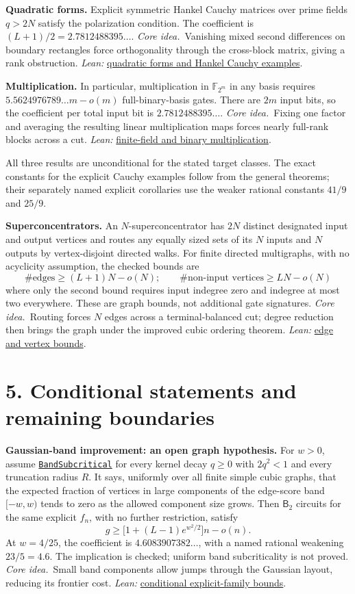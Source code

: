 \documentclass[11pt]{article}
\providecommand{\RepoRoot}{../../}
\newcommand{\repolink}[2]{\href{\RepoRoot#1}{#2}}
\newcommand{\leanlink}[2]{\repolink{Complexitylib/Algebraic/LowerBound/Cutwidth/#1}{#2}}
\newcommand{\method}{\textit{Core idea.}\ }
\newcommand{\Btwo}{\mathsf{B}_2}
\newcommand{\little}[1]{o(#1)}
\begin{document}
\textbf{Quadratic forms.} Explicit symmetric Hankel Cauchy matrices over prime
fields $q>2N$ satisfy the polarization condition. The coefficient is
$(L+1)/2=2.7812488395\ldots$.
\method Vanishing mixed second differences on boundary rectangles force
orthogonality through the cross-block matrix, giving a rank obstruction.
\textit{Lean:} \leanlink{MultiOutput/Quadratic.lean}{quadratic forms and Hankel Cauchy examples}.

\textbf{Multiplication.} In particular, multiplication in $\mathbb F_{2^m}$ in
any basis requires $5.5624976789\ldots m-\little m$ full-binary-basis gates.
There are $2m$ input bits, so the coefficient per total input bit is
$2.7812488395\ldots$.
\method Fixing one factor and averaging the resulting linear multiplication
maps forces nearly full-rank blocks across a cut.
\textit{Lean:} \leanlink{MultiOutput/FieldMul.lean}{finite-field and binary multiplication}.

All three results are unconditional for the stated target classes.
The exact constants for the explicit Cauchy examples follow from the general
theorems; their separately named explicit corollaries use the weaker rational
constants $41/9$ and $25/9$.

\medskip
\textbf{Superconcentrators.} An $N$-superconcentrator has $2N$ distinct designated
input and output vertices and routes any equally sized sets of its $N$ inputs
and $N$ outputs by vertex-disjoint directed walks.
For finite directed multigraphs, with no acyclicity assumption, the checked bounds are
\[
 \#\text{edges}\geq(L+1)N-\little N;
 \qquad
 \#\text{non-input vertices}\geq LN-\little N
\]
where only the second bound requires input indegree zero and indegree at most
two everywhere. These are graph bounds, not additional gate signatures.
\method Routing forces $N$ edges across a terminal-balanced cut; degree
reduction then brings the graph under the improved cubic ordering theorem.
\textit{Lean:} \leanlink{Superconcentrator.lean}{edge and vertex bounds}.

\newpage
\section*{5. Conditional statements and remaining boundaries}

\textbf{Gaussian-band improvement: an open graph hypothesis.}
For $w>0$, assume \leanlink{Gaussian/Band/Defs.lean}{\texttt{BandSubcritical}}
for every kernel decay $q\geq0$ with $2q^2<1$ and every truncation radius $R$.
It says, uniformly over all finite simple cubic graphs, that the expected
fraction of vertices in large components of the edge-score band $[-w,w)$
tends to zero as the allowed component size grows. Then $\Btwo$ circuits for
the same explicit $f_n$, with no further restriction, satisfy
\[
  g\geq\bigl[1+(L-1)e^{w^2/2}\bigr]n-\little n.
\]
At $w=4/25$, the coefficient is $4.6083907382\ldots$, with a named rational
weakening $23/5=4.6$. The implication is checked; uniform band subcriticality
is not proved.
\method Small band components allow jumps through the Gaussian layout,
reducing its frontier cost.
\textit{Lean:} \leanlink{Extractor/SourceReduction/Construction/Hardness.lean}{conditional explicit-family bounds}.
\end{document}
